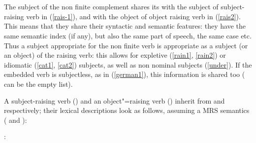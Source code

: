 \documentclass[output=paper
	        ,collection
	        ,collectionchapter
 	        ,biblatex
                ,babelshorthands
                ,newtxmath
                ,draftmode
                ,colorlinks, citecolor=brown
]{langscibook}
\begin{document}
\eal
\label{rsg}
\ex {} \impl\\
\avm{ [ \argst  \1 \+ < [subj & \1 ] > ]} \label{rais-1}
\ex {}  \impl\\
\avm{ [ \argst  < NP > \+ \1 \+ < [subj & \1 ] > ]} \label{rais2}
\zl


The subject of the non finite complement shares its  with the subject of subject-raising verb in (\ref{rais-1}), and with the object of object raising verb in (\ref{rais2}). This means that they share their syntactic and semantic features: they have the same semantic index (if any), but also the same part of speech, the same case etc. Thus a subject appropriate for the non finite verb is appropriate as a subject (or an object) of the raising verb: this allows for expletive (\ref{rain1}, \ref{rain2}) or idiomatic (\ref{cat1}, \ref{cat2}) subjects, as well as non nominal subjects (\ref{under}). If the embedded verb is subjectless, as in (\ref{german1}), this information is shared too ( can be the empty list).

A subject-raising verb () and an object"=raising verb () inherit from  and  respectively; their lexical descriptions look as follows, assuming a MRS semantics (\citealp{CFPS2005a} and ):

\eas
{}:\\
\zs
\end{document}
